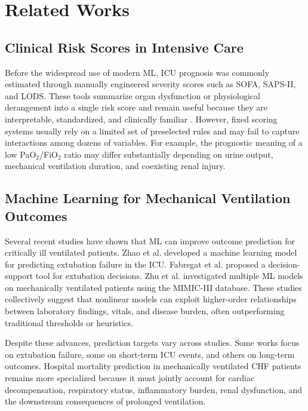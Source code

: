 \documentclass[a4paper,12pt]{extreport}
\begin{document}
\chapter{Related Works}

\section{Clinical Risk Scores in Intensive Care}
Before the widespread use of modern ML, ICU prognosis was commonly estimated through manually engineered severity scores such as SOFA, SAPS-II, and LODS. These tools summarize organ dysfunction or physiological derangement into a single risk score and remain useful because they are interpretable, standardized, and clinically familiar \cite{lambden2019sofa,legall1996lods,salluh2014icu}. However, fixed scoring systems usually rely on a limited set of preselected rules and may fail to capture interactions among dozens of variables. For example, the prognostic meaning of a low PaO\(_2\)/FiO\(_2\) ratio may differ substantially depending on urine output, mechanical ventilation duration, and coexisting renal injury.

\section{Machine Learning for Mechanical Ventilation Outcomes}
Several recent studies have shown that ML can improve outcome prediction for critically ill ventilated patients. Zhao et al. \cite{zhao2021development} developed a machine learning model for predicting extubation failure in the ICU. Fabregat et al. \cite{fabregat2021machine} proposed a decision-support tool for extubation decisions. Zhu et al. \cite{zhu2021ml} investigated multiple ML models on mechanically ventilated patients using the MIMIC-III database. These studies collectively suggest that nonlinear models can exploit higher-order relationships between laboratory findings, vitals, and disease burden, often outperforming traditional thresholds or heuristics.

Despite these advances, prediction targets vary across studies. Some works focus on extubation failure, some on short-term ICU events, and others on long-term outcomes. Hospital mortality prediction in mechanically ventilated CHF patients remains more specialized because it must jointly account for cardiac decompensation, respiratory status, inflammatory burden, renal dysfunction, and the downstream consequences of prolonged ventilation.
\end{document}
